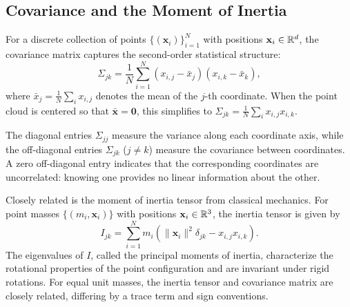 \subsection{Covariance and the Moment of Inertia}

For a discrete collection of points $\{(\mathbf{x}_i)\}_{i=1}^{N}$ with positions $\mathbf{x}_i \in \mathbb{R}^d$,
the covariance matrix captures the second-order statistical structure:
\begin{equation}
\Sigma_{jk} = \frac{1}{N} \sum_{i=1}^{N} (x_{i,j} - \bar{x}_j)(x_{i,k} - \bar{x}_k),
\end{equation}
where $\bar{x}_j = \frac{1}{N} \sum_i x_{i,j}$ denotes the mean of the $j$-th coordinate.
When the point cloud is centered so that $\bar{\mathbf{x}} = \mathbf{0}$, 
this simplifies to $\Sigma_{jk} = \frac{1}{N} \sum_i x_{i,j} x_{i,k}$.

The diagonal entries $\Sigma_{jj}$ measure the variance along each coordinate axis,
while the off-diagonal entries $\Sigma_{jk}$ ($j \neq k$) measure the covariance between coordinates.
A zero off-diagonal entry indicates that the corresponding coordinates are uncorrelated:
knowing one provides no linear information about the other.

Closely related is the moment of inertia tensor from classical mechanics.
For point masses $\{(m_i, \mathbf{x}_i)\}$ with positions $\mathbf{x}_i \in \mathbb{R}^3$, 
the inertia tensor is given by
\begin{equation}
I_{jk} = \sum_{i=1}^{N} m_i \left( \|\mathbf{x}_i\|^2 \delta_{jk} - x_{i,j} x_{i,k} \right).
\end{equation}
The eigenvalues of $I$, called the principal moments of inertia, 
characterize the rotational properties of the point configuration
and are invariant under rigid rotations.
For equal unit masses, the inertia tensor and covariance matrix are closely related,
differing by a trace term and sign conventions.
